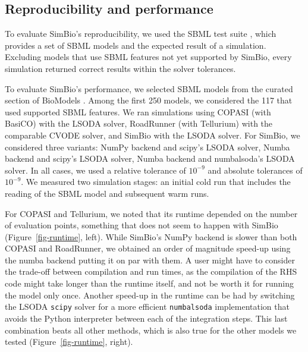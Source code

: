 \documentclass{article}
\begin{document}


\hypertarget{reproducibility-and-performance}{%
\subsection{Reproducibility and
performance}\label{reproducibility-and-performance}}



To evaluate SimBio's reproducibility,
we used the \ac{SBML} test suite \cite{SBMLTestSuite},
which provides a set of \ac{SBML} models
and the expected result of a simulation.
Excluding models that use \ac{SBML} features not yet supported by SimBio,
every simulation returned correct results within the solver tolerances.

To evaluate SimBio's performance,
we selected \ac{SBML} models from the curated section of BioModels \cite{malik-sheriffBioModels15Years2020}.
Among the first 250 models,
we considered the 117 that used supported \ac{SBML} features.
We ran simulations using
COPASI (with BasiCO) with the LSODA solver,
RoadRunner (with Tellurium) with the comparable CVODE solver, and
SimBio with the LSODA solver.
For SimBio, we considered three variants:
NumPy backend and scipy's LSODA solver,
Numba backend and scipy's LSODA solver,
Numba backend and numbalsoda's LSODA solver.
In all cases, we used a relative tolerance of \(10^{-9}\) and absolute tolerances of \(10^{-9}\).
We measured two simulation stages:
an initial cold run that includes the reading of the \ac{SBML} model
and subsequent warm runs.

For COPASI and Tellurium,
we noted that its runtime depended on the number of evaluation points,
something that does not seem to happen with SimBio (Figure~\ref{fig-runtime}, left).
While SimBio's NumPy backend is slower than both COPASI and RoadRunner,
we obtained an order of magnitude speed-up using the numba backend
putting it on par with them.
A user might have to consider the trade-off between compilation and run times,
as the compilation of the \ac{RHS} code might take longer than the runtime itself,
and not be worth it for running the model only once.
Another speed-up in the runtime can be had by switching the LSODA \texttt{scipy} solver
for a more efficient \texttt{numbalsoda} implementation that avoids the Python interpreter
between each of the integration steps.
This last combination beats all other methods,
which is also true for the other models we tested (Figure~\ref{fig-runtime}, right).
\end{document}
